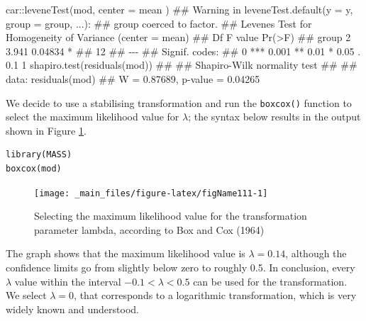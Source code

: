 \documentclass[a4paper,12pt,oneside]{book}
\newenvironment{Shaded}{\begin{snugshade}}{\end{snugshade}}
\newcommand{\SpecialCharTok}[1]{#1}
\newcommand{\DocumentationTok}[1]{#1}
\newcommand{\FunctionTok}[1]{#1}
\newcommand{\AttributeTok}[1]{#1}
\newcommand{\NormalTok}[1]{#1}
\begin{document}
\begin{Shaded}
\begin{Highlighting}[]
\NormalTok{car}\SpecialCharTok{::}\FunctionTok{leveneTest}\NormalTok{(mod, }\AttributeTok{center =}\NormalTok{ mean )}
\DocumentationTok{\#\# Warning in leveneTest.default(y = y, group = group, ...):}
\DocumentationTok{\#\# group coerced to factor.}
\DocumentationTok{\#\# Levene\textquotesingle{}s Test for Homogeneity of Variance (center = mean)}
\DocumentationTok{\#\#       Df F value  Pr(\textgreater{}F)  }
\DocumentationTok{\#\# group  2   3.941 0.04834 *}
\DocumentationTok{\#\#       12                  }
\DocumentationTok{\#\# {-}{-}{-}}
\DocumentationTok{\#\# Signif. codes:  }
\DocumentationTok{\#\# 0 \textquotesingle{}***\textquotesingle{} 0.001 \textquotesingle{}**\textquotesingle{} 0.01 \textquotesingle{}*\textquotesingle{} 0.05 \textquotesingle{}.\textquotesingle{} 0.1 \textquotesingle{} \textquotesingle{} 1}
\FunctionTok{shapiro.test}\NormalTok{(}\FunctionTok{residuals}\NormalTok{(mod))}
\DocumentationTok{\#\# }
\DocumentationTok{\#\#  Shapiro{-}Wilk normality test}
\DocumentationTok{\#\# }
\DocumentationTok{\#\# data:  residuals(mod)}
\DocumentationTok{\#\# W = 0.87689, p{-}value = 0.04265}
\end{Highlighting}
\end{Shaded}

We decide to use a stabilising transformation and run the \texttt{boxcox()} function to select the maximum likelihood value for \(\lambda\); the syntax below results in the output shown in Figure \ref{fig:figName111}.

\begin{verbatim}
library(MASS)
boxcox(mod)
\end{verbatim}

\begin{figure}

{\centering \texttt{[image: \_main\_files/figure-latex/figName111-1]} 

}

\caption{Selecting the maximum likelihood value for the transformation parameter lambda, according to Box and Cox (1964)}\label{fig:figName111}
\end{figure}

The graph shows that the maximum likelihood value is \(\lambda = 0.14\), although the confidence limits go from slightly below zero to roughly 0.5. In conclusion, every \(\lambda\) value within the interval \(-0.1 < \lambda < 0.5\) can be used for the transformation. We select \(\lambda = 0\), that corresponds to a logarithmic transformation, which is very widely known and understood.
\end{document}
